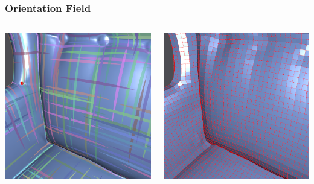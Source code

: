\documentclass[aspectratio=43,sanserif,professionalfonts]{beamer}
\begin{document}
\begin{frame}
	\frametitle{Orientation Field}
	\begin{columns}
		\begin{column}{0.5\textwidth}
			\center
			\includegraphics[width=\textwidth]{img/orientation.png}
		\end{column}
		\begin{column}{0.5\textwidth}
			\center
			\includegraphics[width=\textwidth]{img/output-pure.png}
		\end{column}
	\end{columns}
\end{frame}
\end{document}
